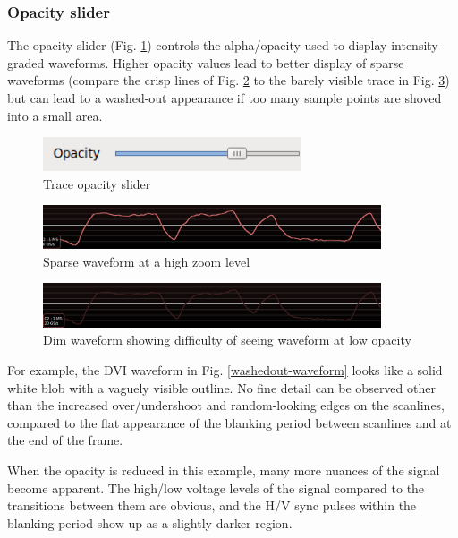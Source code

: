 \documentclass[11pt]{article}
\begin{document}
\subsubsection{Opacity slider}

The opacity slider (Fig. \ref{opacityslider}) controls the alpha/opacity used to display intensity-graded waveforms.
Higher opacity values lead to better display of sparse waveforms (compare the crisp lines of Fig. \ref{sparse-waveform}
to the barely visible trace in Fig. \ref{dim-waveform}) but can lead to a washed-out appearance if too many sample
points are shoved into a small area.

\begin{figure}[H]
\centering
\includegraphics[height=1cm]{images/opacity-slider.png}
\caption{Trace opacity slider}
\label{opacityslider}
\end{figure}

\begin{figure}[H]
\centering
\includegraphics[width=10cm]{images/sparse-waveform.png}
\caption{Sparse waveform at a high zoom level}
\label{sparse-waveform}
\end{figure}

\begin{figure}[H]
\centering
\includegraphics[width=10cm]{images/dim-waveform.png}
\caption{Dim waveform showing difficulty of seeing waveform at low opacity}
\label{dim-waveform}
\end{figure}

For example, the DVI waveform in Fig. \ref{washedout-waveform} looks like a solid white blob with a vaguely visible
outline. No fine detail can be observed other than the increased over/undershoot and random-looking edges on the
scanlines, compared to the flat appearance of the blanking period between scanlines and at the end of the frame.

When the opacity is reduced in this example, many more nuances of the signal become apparent. The high/low voltage
levels of the signal compared to the transitions between them are obvious, and the H/V sync pulses within the blanking
period show up as a slightly darker region.
\end{document}

